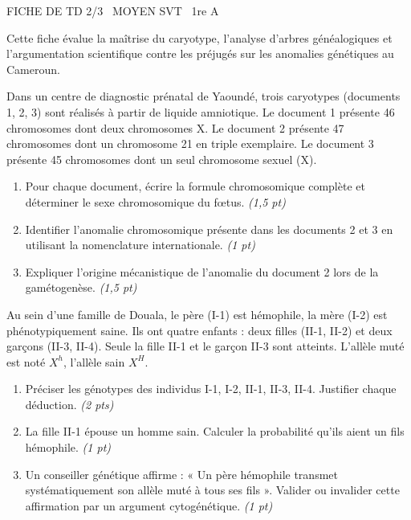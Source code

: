 \documentclass[11pt]{article}
\begin{document}
\begin{tcolorbox}[enhanced,colback=popink,colframe=popink,arc=10pt,boxrule=0pt,left=12pt,right=12pt,top=9pt,bottom=9pt]
{\color{white}\popxbold\small FICHE DE TD 2/3 \textbullet\ MOYEN \hfill SVT \textbullet\ 1re A\par}
\end{tcolorbox}
\vspace{4pt}
Cette fiche évalue la maîtrise du caryotype, l'analyse d'arbres généalogiques et l'argumentation scientifique contre les préjugés sur les anomalies génétiques au Cameroun.

\begin{exercice}
\label{exo:caryotype}
Dans un centre de diagnostic prénatal de Yaoundé, trois caryotypes (documents 1, 2, 3) sont réalisés à partir de liquide amniotique. Le document 1 présente 46 chromosomes dont deux chromosomes X. Le document 2 présente 47 chromosomes dont un chromosome 21 en triple exemplaire. Le document 3 présente 45 chromosomes dont un seul chromosome sexuel (X).
\begin{enumerate}
    \item Pour chaque document, écrire la formule chromosomique complète et déterminer le sexe chromosomique du fœtus. \textit{(1,5 pt)}
    \item Identifier l'anomalie chromosomique présente dans les documents 2 et 3 en utilisant la nomenclature internationale. \textit{(1 pt)}
    \item Expliquer l'origine mécanistique de l'anomalie du document 2 lors de la gamétogenèse. \textit{(1,5 pt)}
\end{enumerate}
\end{exercice}

\begin{exercice}
\label{exo:hemophilie}
Au sein d'une famille de Douala, le père (I-1) est hémophile, la mère (I-2) est phénotypiquement saine. Ils ont quatre enfants : deux filles (II-1, II-2) et deux garçons (II-3, II-4). Seule la fille II-1 et le garçon II-3 sont atteints. L'allèle muté est noté $X^h$, l'allèle sain $X^H$.
\begin{enumerate}
    \item Préciser les génotypes des individus I-1, I-2, II-1, II-3, II-4. Justifier chaque déduction. \textit{(2 pts)}
    \item La fille II-1 épouse un homme sain. Calculer la probabilité qu'ils aient un fils hémophile. \textit{(1 pt)}
    \item Un conseiller génétique affirme : « Un père hémophile transmet systématiquement son allèle muté à tous ses fils ». Valider ou invalider cette affirmation par un argument cytogénétique. \textit{(1 pt)}
\end{enumerate}
\end{exercice}
\end{document}
